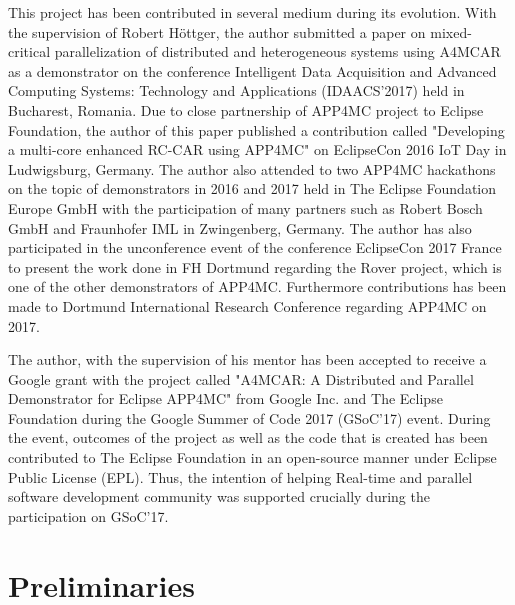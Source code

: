 This project has been contributed in several medium during its evolution. With the supervision of Robert H{\"o}ttger, the author submitted a paper on mixed-critical parallelization of distributed and heterogeneous systems \cite{constrainedpaper} using A4MCAR as a demonstrator on the conference Intelligent Data Acquisition and Advanced Computing Systems: Technology and Applications (IDAACS'2017) held in Bucharest, Romania. Due to close partnership of APP4MC project to Eclipse Foundation, the author of this paper published a contribution called "Developing a multi-core enhanced RC-CAR using APP4MC" on EclipseCon 2016 IoT Day in Ludwigsburg, Germany. The author also attended to two APP4MC hackathons on the topic of demonstrators in 2016 and 2017 held in The Eclipse Foundation Europe GmbH with the participation of many partners such as Robert Bosch GmbH and Fraunhofer IML in Zwingenberg, Germany. The author has also participated in the unconference event of the conference EclipseCon 2017 France to present the work done in FH Dortmund regarding the Rover project, which is one of the other demonstrators of APP4MC. Furthermore contributions has been made to Dortmund International Research Conference  regarding APP4MC on 2017.

The author, with the supervision of his mentor has been accepted to receive a Google grant with the project called "A4MCAR: A Distributed and Parallel Demonstrator for Eclipse APP4MC" \cite{gsoc} from Google Inc. and The Eclipse Foundation during the Google Summer of Code 2017 (GSoC'17) event. During the event, outcomes of the project as well as the code that is created has been contributed to The Eclipse Foundation in an open-source manner under Eclipse Public License (EPL). Thus, the intention of helping Real-time and parallel software development community was supported crucially during the participation on GSoC'17.
\newpage
\section{Preliminaries}
